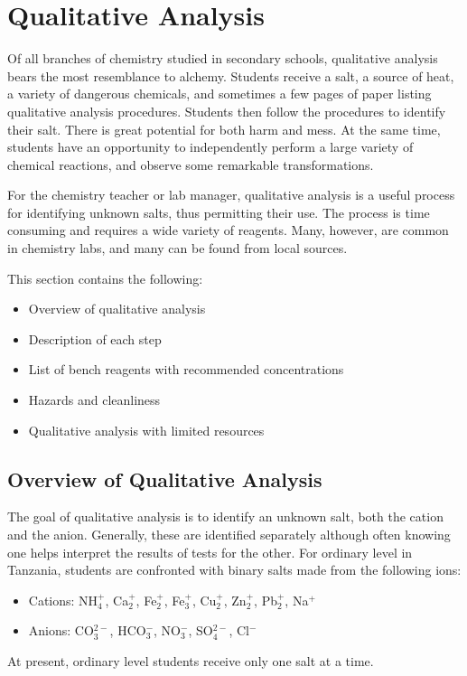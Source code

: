 \chapter{Qualitative Analysis}
\label{cha:qualana}
Of all branches of chemistry studied in secondary schools, 
qualitative analysis bears the most resemblance to alchemy. 
Students receive a salt, 
a source of heat, 
a variety of dangerous chemicals, 
and sometimes a few pages of paper listing 
qualitative analysis procedures. 
Students then follow the procedures to identify their salt. 
There is great potential for both harm and mess. 
At the same time, 
students have an opportunity to independently perform 
a large variety of chemical reactions, 
and observe some remarkable transformations.

For the chemistry teacher or lab manager, 
qualitative analysis is a useful process for identifying unknown salts, 
thus permitting their use. 
The process is time consuming and requires a wide variety of reagents. 
Many, 
however, 
are common in chemistry labs, 
and many can be found from local sources.

This section contains the following:
\begin{itemize}
\item{Overview of qualitative analysis}
\item{Description of each step}
\item{List of bench reagents with recommended concentrations}
\item{Hazards and cleanliness}
\item{Qualitative analysis with limited resources}
\end{itemize}

\section{Overview of Qualitative Analysis}
The goal of qualitative analysis is to identify an unknown salt, 
both the cation and the anion. 
Generally, 
these are identified separately 
although often knowing one helps interpret 
the results of tests for the other.
For ordinary level in Tanzania, 
students are confronted with binary salts made from the following ions:
\begin{itemize}
\item{Cations: NH$_{4}^{+}$, 
Ca$_{2}^{+}$, 
Fe$_{2}^{+}$, 
Fe$_{3}^{+}$, 
Cu$_{2}^{+}$, 
Zn$_{2}^{+}$, 
Pb$_{2}^{+}$, 
Na$^{+}$}
\item{Anions: CO$_{3}^{2-}$, 
HCO$_{3}^{-}$, 
NO$_{3}^{-}$, 
SO$_{4}^{2-}$, 
Cl$^{-}$}
\end{itemize}
At present, 
ordinary level students receive only one salt at a time. 

